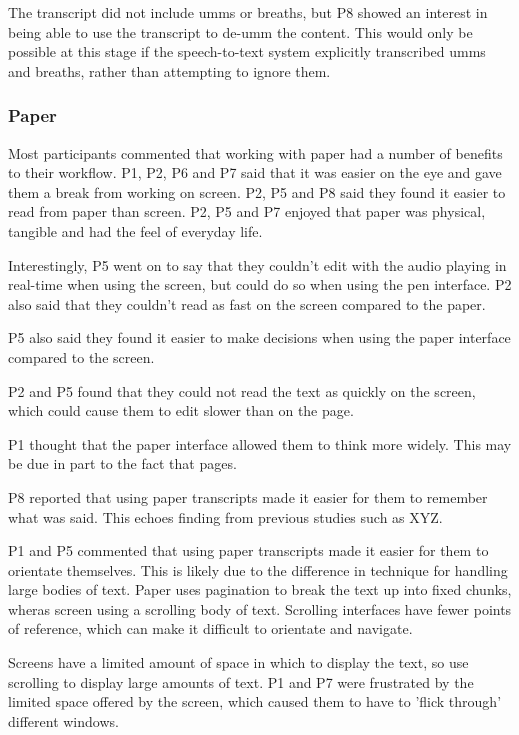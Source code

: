 
The transcript did not include umms or breaths, but P8 showed an interest in being able to use the transcript to de-umm
the content. This would only be possible at this stage if the speech-to-text system explicitly transcribed umms and
breaths, rather than attempting to ignore them.

\subsubsection{Paper}


Most participants commented that working with paper had a number of benefits to their workflow. P1, P2, P6 and P7 said
that it was easier on the eye and gave them a break from working on screen. P2, P5 and P8 said they found it easier to
read from paper than screen. P2, P5 and P7 enjoyed that paper was physical, tangible and had the feel of everyday life.


Interestingly, P5 went on to say that they couldn't edit with the audio playing in real-time when using the screen, but
could do so when using the pen interface. P2 also said that they couldn't read as fast on the screen compared to the
paper.

P5 also said they found it easier to make decisions when using the paper interface compared to the screen.

P2 and P5 found that they could not read the text as quickly on the screen, which could cause them to edit slower than
on the page.

P1 thought that the paper interface allowed them to think more widely. This may be due in part to the fact that pages.

P8 reported that using paper transcripts made it easier for them to remember what was said. This echoes finding from
previous studies such as XYZ.


P1 and P5 commented that using paper transcripts made it easier for them to orientate themselves. This is likely due to
the difference in technique for handling large bodies of text. Paper uses pagination to break the text up into fixed
chunks, wheras screen using a scrolling body of text. Scrolling interfaces have fewer points of reference, which can
make it difficult to orientate and navigate.

Screens have a limited amount of space in which to display the text, so use scrolling to display large amounts of text.
P1 and P7 were frustrated by the limited space offered by the screen, which caused them to have to 'flick through'
different windows.

